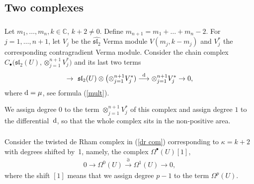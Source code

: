 \documentclass[pdftex]{sigma}
\numberwithin{equation}{section}
\begin{document}
\subsection{Two complexes}

\subsubsection{} Let $m_1,\dots,m_n, k\in{\mathbb C} $, $k+2\ne 0$. Define $m_{n+1}=m_1+\dots+m_n-2$. For $j=1,\dots, n+1$, let $V_j$ be the $\widehat{{\mathfrak{sl}_2}}$ Verma module $V(m_j,k-m_j)$ and $V_j^*$ the corresponding contragradient Verma module. Consider the chain complex $C_{\bullet}\big(\mathfrak{sl}_2(U), \otimes_{j=1}^{n+1}V_j^*\big)$ and its last two terms{\samepage
\begin{gather*}%
\to\ \mathfrak{sl}_2(U) \otimes \big({\otimes}_{j=1}^{n+1}V_j^*)\overset{{\rm d}}{\longrightarrow} \otimes_{j=1}^{n+1}V_j^* \to 0,
\end{gather*}
where ${\rm d}=\mu$, see formula (\ref{mult}).}

We assign degree $0$ to the term $\otimes_{j=1}^{n+1}V_j^*$ of this complex and assign degree $1$ to the differential~${\rm d}$, so that the whole complex sits in the non-positive area.

\subsubsection{} Consider the twisted de Rham complex in (\ref{dr com}) corresponding to $\kappa=k+2$ with degrees shifted by~1, namely, the complex $\Omega^{\bullet}(U)[1]$,
\begin{gather*}%
 0\to\Omega^0(U) \overset{\partial}{\longrightarrow} \Omega^1(U)\to 0,
\end{gather*}
where the shift $[1]$ means that we assign degree $p-1$ to the term $\Omega^p(U)$.
\end{document}
